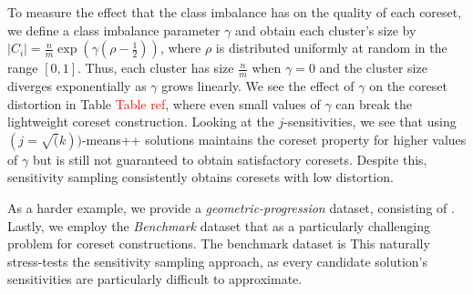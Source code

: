 To measure the effect that the class imbalance has on the quality of each coreset, we define a class imbalance parameter $\gamma$ and obtain each
cluster's size by $|C_i| = \frac{n}{m} \exp \left( \gamma(\rho - \frac{1}{2}) \right)$, where $\rho$ is distributed uniformly at random in the range $[0, 1]$.
Thus, each cluster has size $\frac{n}{m}$ when $\gamma = 0$ and the cluster size diverges exponentially as $\gamma$ grows linearly. We see the effect of $\gamma$ on the coreset
distortion in Table \textcolor{red}{Table ref}, where even small values of $\gamma$ can break the lightweight coreset construction. Looking at the
$j$-sensitivities, we see that using $(j=\sqrt(k))$-means++ solutions maintains the coreset property for higher values of $\gamma$ but is still not guaranteed
to obtain satisfactory coresets. Despite this, sensitivity sampling consistently obtains coresets with low distortion.

As a harder example, we provide a \emph{geometric-progression} dataset, consisting of . 
Lastly, we employ the \emph{Benchmark} dataset that  as a particularly challenging problem for coreset constructions.  The
benchmark dataset is  This naturally stress-tests
the sensitivity sampling approach, as every candidate solution's sensitivities are particularly difficult to approximate.




